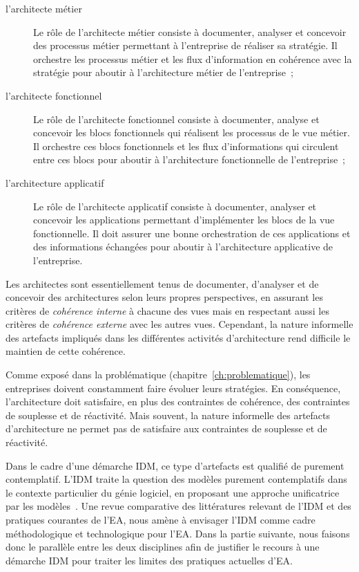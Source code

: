 \begin{description}
    \item[l'architecte métier]
    Le rôle de l'architecte métier consiste à documenter, analyser et concevoir
    des processus métier permettant à l'entreprise de réaliser sa stratégie.
    Il orchestre les processus métier et les flux d'information en cohérence
    avec la stratégie pour aboutir à l'architecture métier de l'entreprise~;

    \item[l'architecte fonctionnel]
    Le rôle de l'architecte fonctionnel consiste à documenter, analyse et
    concevoir les blocs fonctionnels qui réalisent les processus de
    le vue métier. Il orchestre ces blocs fonctionnels et les flux d'informations
    qui circulent entre ces blocs pour aboutir à l'architecture fonctionnelle
    de l'entreprise~;

    \item[l'architecture applicatif]
    Le rôle de l'architecte applicatif consiste à documenter, analyser
    et concevoir les applications permettant d'implémenter les blocs
    de la vue fonctionnelle. Il doit assurer une bonne orchestration de ces
    applications et des informations échangées pour aboutir à l'architecture
    applicative de l'entreprise.
\end{description}

Les architectes sont essentiellement tenus de documenter, d'analyser et de
concevoir des architectures selon leurs propres perspectives, en assurant les
critères de \emph{cohérence interne} à chacune des vues mais en respectant
aussi les critères de \emph{cohérence externe} avec les autres vues. Cependant,
la nature informelle des artefacts impliqués dans les différentes activités
d’architecture rend difficile le maintien de cette cohérence.

Comme exposé dans la problématique (chapitre~\ref{ch:problematique}), les
entreprises doivent constamment faire évoluer leurs stratégies. En conséquence,
l'architecture doit satisfaire, en plus des contraintes de cohérence, des
contraintes de souplesse et de réactivité. Mais souvent, la nature informelle
des artefacts d’architecture ne permet pas de satisfaire aux contraintes de
souplesse et de réactivité.

Dans le cadre d'une démarche IDM, ce type d'artefacts est qualifié de purement
contemplatif. L'IDM traite la question des modèles purement contemplatifs dans
le contexte particulier du génie logiciel, en proposant une approche
unificatrice par les modèles~\cite{jezequel2006genie}. Une revue comparative
des littératures relevant de l'IDM et des pratiques courantes de l'EA, nous
amène à envisager l'IDM comme cadre méthodologique et technologique pour l'EA.
Dans la partie suivante, nous faisons donc le parallèle entre les deux
disciplines afin de justifier le recours à une démarche IDM  pour traiter les
limites  des pratiques actuelles d'EA.

